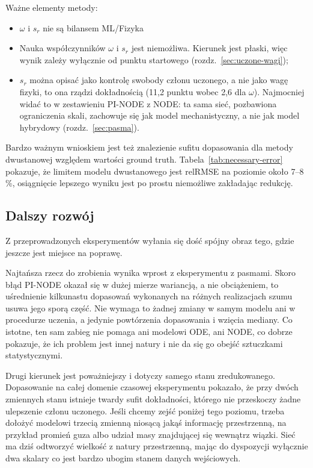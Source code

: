 \documentclass[11pt,a4paper]{article}
\begin{document}
Ważne elementy metody:

\begin{itemize}
\item $\omega$ i $s_r$ nie są bilansem ML/Fizyka

\item Nauka współczynników $\omega$ i $s_r$ jest niemożliwa. Kierunek jest płaski, więc wynik zależy
wyłącznie od punktu startowego (rozdz.~\ref{sec:uczone-wagi});

\item $s_r$ można opisać jako kontrolę swobody członu uczonego, a nie jako wagę
fizyki, to ona rządzi dokładnością (11,2 punktu wobec 2,6 dla $\omega$). Najmocniej
widać to w zestawieniu PI-NODE z NODE: ta sama sieć, pozbawiona ograniczenia skali,
zachowuje się jak model mechanistyczny, a nie jak model hybrydowy
(rozdz.~\ref{sec:pasma}).
\end{itemize}

Bardzo ważnym wnioskiem jest też znalezienie sufitu dopasowania dla metody dwustanowej
względem wartości ground truth. Tabela~\ref{tab:necessary-error} pokazuje, że limitem
modelu dwustanowego jest relRMSE na poziomie około 7--8\,\%, osiągnięcie lepszego wyniku
jest po prostu niemożliwe zakładając redukcję.

\subsection*{Dalszy rozwój}

Z przeprowadzonych eksperymentów wyłania się dość spójny obraz tego, gdzie jeszcze jest
miejsce na poprawę.

Najtańsza rzecz do zrobienia wynika wprost z eksperymentu z pasmami. Skoro błąd PI-NODE
okazał się w dużej mierze wariancją, a nie obciążeniem, to uśrednienie kilkunastu
dopasowań wykonanych na różnych realizacjach szumu usuwa jego sporą część. Nie wymaga to
żadnej zmiany w samym modelu ani w procedurze uczenia, a jedynie powtórzenia dopasowania
i wzięcia mediany. Co istotne, ten sam zabieg nie pomaga ani modelowi ODE, ani NODE, co
dobrze pokazuje, że ich problem jest innej natury i nie da się go obejść sztuczkami
statystycznymi.

Drugi kierunek jest poważniejszy i dotyczy samego stanu zredukowanego. Dopasowanie
na całej domenie czasowej eksperymentu pokazało, że przy dwóch zmiennych stanu istnieje twardy sufit dokładności,
którego nie przeskoczy żadne ulepszenie członu uczonego. Jeśli chcemy zejść poniżej tego poziomu, trzeba dołożyć
modelowi trzecią zmienną niosącą jakąś informację przestrzenną, na przykład promień guza
albo udział masy znajdującej się wewnątrz wiązki. Sieć ma dziś odtworzyć wielkość
z natury przestrzenną, mając do dyspozycji wyłącznie dwa skalary co jest bardzo ubogim stanem danych wejściowych.
\end{document}
